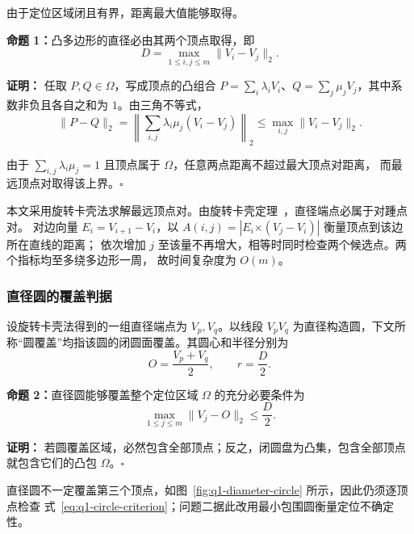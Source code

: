 由于定位区域闭且有界，距离最大值能够取得。

\noindent\textbf{命题 1：}{\kaishu 凸多边形的直径必由其两个顶点取得，即}
\begin{equation}
  D=\max_{1\leq i,j\leq m}\|V_i-V_j\|_2.
  \label{eq:q1-vertex-diameter}
\end{equation}

\noindent\textbf{证明：}
任取 $P,Q\in\Omega$，写成顶点的凸组合 $P=\sum_i\lambda_iV_i$、$Q=\sum_j\mu_jV_j$，其中系数非负且各自之和为 $1$。由三角不等式，
\begin{equation}
  \|P-Q\|_2
  =\left\|\sum_{i,j}\lambda_i\mu_j(V_i-V_j)\right\|_2
  \leq\max_{i,j}\|V_i-V_j\|_2.
  \label{eq:q1-diameter-proof}
\end{equation}

由于 $\sum_{i,j}\lambda_i\mu_j=1$ 且顶点属于 $\Omega$，任意两点距离不超过最大顶点对距离，
而最远顶点对取得该上界。\hfill$\square$

本文采用旋转卡壳法求解最远顶点对。由旋转卡壳定理~\cite{toussaint1983}，直径端点必属于对踵点对。
对边向量 $E_i=V_{i+1}-V_i$，以
$A(i,j)=|E_i\mathbin{\boldsymbol{\times}}(V_j-V_i)|$ 衡量顶点到该边所在直线的距离；
依次增加 $j$ 至该量不再增大，相等时同时检查两个候选点。两个指标均至多绕多边形一周，
故时间复杂度为 $O(m)$。

\subsubsection{直径圆的覆盖判据}

设旋转卡壳法得到的一组直径端点为 $V_p,V_q$。以线段 $V_pV_q$ 为直径构造圆，下文所称“圆覆盖”均指该圆的闭圆面覆盖。其圆心和半径分别为
\begin{equation}
  O=\frac{V_p+V_q}{2},\qquad r=\frac{D}{2}.
  \label{eq:q1-diameter-circle}
\end{equation}

\noindent\textbf{命题 2：}{\kaishu 直径圆能够覆盖整个定位区域 $\Omega$ 的充分必要条件为}
\begin{equation}
  \max_{1\leq j\leq m}\|V_j-O\|_2\leq\frac{D}{2}.
  \label{eq:q1-circle-criterion}
\end{equation}

\noindent\textbf{证明：}
若圆覆盖区域，必然包含全部顶点；反之，闭圆盘为凸集，包含全部顶点就包含它们的凸包 $\Omega$。\hfill$\square$

直径圆不一定覆盖第三个顶点，如图~\ref{fig:q1-diameter-circle} 所示，因此仍须逐顶点检查
式~\eqref{eq:q1-circle-criterion}；问题二据此改用最小包围圆衡量定位不确定性。

